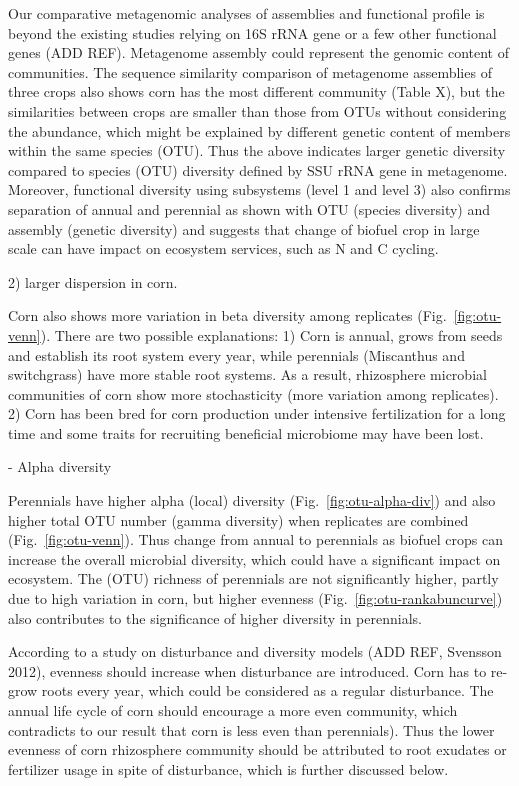 \documentclass[12pt]{article}
\begin{document}
Our comparative metagenomic analyses of assemblies and functional profile is beyond the existing studies relying on 16S rRNA gene or a few other functional genes (ADD REF). Metagenome assembly could represent the genomic content of communities. The sequence similarity comparison of metagenome assemblies of three crops also shows corn has the most different community (Table X), but the similarities between crops are smaller than those from OTUs without considering the abundance, which might be explained by different genetic content of members within the same species (OTU). Thus the above indicates larger genetic diversity compared to species (OTU) diversity defined by SSU rRNA gene in metagenome. Moreover, functional diversity using subsystems (level 1 and level 3) also confirms separation of annual and perennial as shown with OTU (species diversity) and assembly (genetic diversity) and suggests that change of biofuel crop in large scale can have impact on ecosystem services, such as N and C cycling.

2) larger dispersion in corn.

Corn also shows more variation in beta diversity among replicates (Fig.~\ref{fig:otu-venn}). There are two possible explanations: 1) Corn is annual, grows from seeds and establish its root system every year, while perennials (Miscanthus and switchgrass) have more stable root systems. As a result, rhizosphere microbial communities of corn show more stochasticity (more variation among replicates). 2) Corn has been bred for corn production under intensive fertilization for a long time and some traits for recruiting beneficial microbiome may have been lost.

- Alpha diversity

Perennials have higher alpha (local) diversity (Fig.~\ref{fig:otu-alpha-div}) and also higher total OTU number (gamma diversity) when replicates are combined (Fig.~\ref{fig:otu-venn}). Thus change from annual to perennials as biofuel crops can increase the overall microbial diversity, which could have a significant impact on ecosystem. The (OTU) richness of perennials are not significantly higher, partly due to high variation in corn, but higher evenness (Fig.~\ref{fig:otu-rankabuncurve}) also contributes to the significance of higher diversity in perennials. 

According to a study on disturbance and diversity models (ADD REF, Svensson 2012), evenness should increase when disturbance are introduced. Corn has to re-grow roots every year, which could be considered as a regular disturbance. The annual life cycle of corn should encourage a more even community, which contradicts to our result that corn is less even than perennials). Thus the lower evenness of corn rhizosphere community should be attributed to root exudates or fertilizer usage in spite of disturbance, which is further discussed below.
\end{document}
